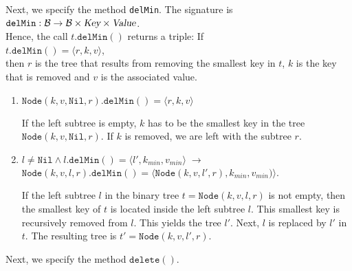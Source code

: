 Next, we specify the  method \texttt{delMin}.  The signature is
\\[0.2cm]
\hspace*{1.3cm}
$\texttt{delMin}:\mathcal{B} \rightarrow \mathcal{B} \times \textsl{Key} \times \textsl{Value}$.
\\[0.2cm]
Hence, the call $t.\texttt{delMin}()$ returns a triple: If 
\\[0.2cm]
\hspace*{1.3cm}
$t.\texttt{delMin}() = \langle r,k,v \rangle$,
\\[0.2cm]
then $r$ is the tree that  results from
removing the smallest key in $t$, $k$ is the key that is removed and $v$ is the associated value.
\begin{enumerate}
\item $\texttt{Node}(k, v, \texttt{Nil}, r).\texttt{delMin}() = \langle r, k, v\rangle$

      If the left subtree is empty, $k$ has to be the smallest key in the tree 
      $\texttt{Node}(k, v, \texttt{Nil}, r)$.  If $k$ is removed, we are left with the subtree $r$.
\item $l\not= \texttt{Nil} \wedge l.\texttt{delMin}() = \langle l',k_{min}, v_{min}\rangle \;\rightarrow$ \\[0.2cm]
       \hspace*{1.3cm} 
       $\texttt{Node}(k, v, l, r).\texttt{delMin}() = \bigl\langle\texttt{Node}(k, v, l', r), k_{min}, v_{min})\bigr\rangle$.

      If the left subtree $l$ in the binary tree $t = \texttt{Node}(k, v, l, r)$
      is not empty, then the smallest key of  $t$ is located inside the left subtree $l$.
      This smallest key is recursively removed from  $l$. This yields the tree 
      $l'$.  Next,  $l$ is replaced by $l'$ in $t$.  The resulting tree is
      $t' = \texttt{Node}(k, v, l', r)$.
\end{enumerate}
Next, we specify the method $\mathtt{delete}()$.
